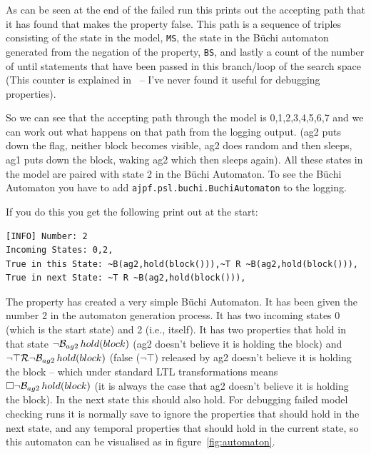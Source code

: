 \documentclass[a4]{article}
\begin{document}
As can be seen at the end of the failed run this prints out the accepting path that it has found that makes the property false.  This path is a sequence of triples consisting of the state in the model, \texttt{MS}, the state in the B\"{u}chi automaton generated from the negation of the property, \texttt{BS}, and lastly a count of the number of until statements that have been passed in this branch/loop of the search space (This counter is explained in~\cite{Gerth:1995:SOA:645837.670574} -- I've never found it useful for debugging properties).

So we can see that the accepting path through the model is 0,1,2,3,4,5,6,7 and we can work out what happens on that path from the logging output.  (ag2 puts down the flag, neither block becomes visible, ag2 does random and then sleeps, ag1 puts down the block, waking ag2 which then sleeps again).  All these states in the model are paired with state 2 in the B\"{u}chi Automaton.  To see the B\"{u}chi Automaton you have to add \texttt{ajpf.psl.buchi.BuchiAutomaton} to the logging.

If you do this you get the following print out at the start:

\begin{verbatim}
[INFO] Number: 2
Incoming States: 0,2,
True in this State: ~B(ag2,hold(block())),~T R ~B(ag2,hold(block())),
True in next State: ~T R ~B(ag2,hold(block())),
\end{verbatim}

The property has created a very simple B\"{u}chi Automaton.  It has been given the number 2 in the automaton generation process.  It has two incoming states 0 (which is the start state) and 2 (i.e., itself).  It has two properties that hold in that state $\neg \mathrm{{\cal B}}_{ag2} \, hold(block)$ (ag2 doesn't believe it is holding the block) and $\neg \top {\cal R} \neg \mathrm{{\cal B}}_{ag2} \, hold(block)$ (false ($\neg \top$) released by ag2 doesn't believe it is holding the block -- which under standard LTL transformations means $\Box \neg \mathrm{{\cal B}}_{ag2} \, hold(block)$ (it is always the case that ag2 doesn't believe it is holding the block).  In the next state this should also hold.  For debugging failed model checking runs it is normally save to ignore the properties that should hold in the next state, and any temporal properties that should hold in the current state, so this automaton can be visualised as in figure~\ref{fig:automaton}.
\end{document}

